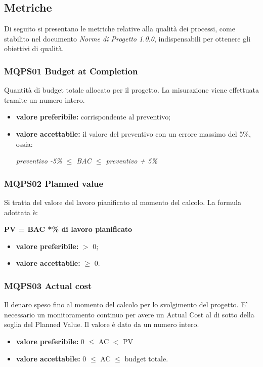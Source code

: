 \subsection{Metriche}\label{QualitàDelProcessoProcessoDiPianificazioneMetriche}
Di seguito si presentano le metriche relative alla qualità dei processi, come stabilito nel
documento \textit{Norme di Progetto 1.0.0}, indispensabili per ottenere gli obiettivi di qualità.

\subsubsection{MQPS01 Budget at Completion}\label{QualitàDelProcessoProcessoDiPianificazioneMetricheMQPS01}
Quantità di budget totale allocato per il progetto.
La misurazione viene effettuata tramite un numero intero.
\begin{itemize}
	\item \textbf{valore preferibile:} corrispondente al preventivo;
	\item \textbf{valore accettabile:} il valore del preventivo con un errore massimo del 5\%, ossia:
	\begin{center}
		\textit{preventivo -5\% $\leq$ BAC $\leq$ preventivo + 5\%}
	\end{center}
\end{itemize}

\subsubsection{MQPS02 Planned value}\label{QualitàDelProcessoProcessoDiPianificazioneMetricheMQPS02}
Si tratta del valore del lavoro pianificato al momento del calcolo.
La formula adottata è:
\begin{center}
	\textbf{PV = BAC *\% di lavoro pianificato}
\end{center}
\begin{itemize}
	\item \textbf{valore preferibile:} $>$ 0;
	\item \textbf{valore accettabile:} $\geq$ 0.
\end{itemize}

\subsubsection{MQPS03 Actual cost}\label{QualitàDelProcessoProcessoDiPianificazioneMetrichePQPS03}
Il denaro speso fino al momento del calcolo per lo svolgimento del progetto.
E’ necessario un monitoramento continuo per avere un Actual Cost al di sotto della soglia del Planned Value. 
Il valore è dato da un numero intero.
\begin{itemize}
	\item \textbf{valore preferibile:} 0 $\leq$ AC $<$ PV
	\item \textbf{valore accettabile:}  0 $\leq$ AC $\leq$  budget totale.
\end{itemize}

